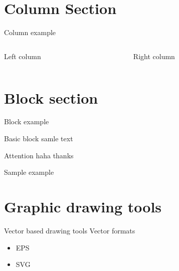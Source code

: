 \documentclass{beamer}
\begin{document}
	\section{Column Section}
	\begin{frame}{Column example}
		\begin{columns}
			\begin{column}{0.5\textwidth}
				Left column
			\end{column}

			\begin{column}{0.5\textwidth}
				\alert{Right column}
			\end{column}


		\end{columns}
	\end{frame}

	\section{Block section}

	\begin{frame}{Block example}
		\begin{block}{Basic block}
			samle text
		\end{block}
		\pause
		\begin{alertblock}{Attention}
			haha thanks
		\end{alertblock}
		\begin{example}
			Sample example
		\end{example}

	\end{frame}

	\section{Graphic drawing tools}
	\begin{frame}{Vector based drawing tools}
		Vector formats
		\begin{itemize}
			\item EPS
			\item SVG
		\end{itemize}
	\end{frame}
\end{document}
